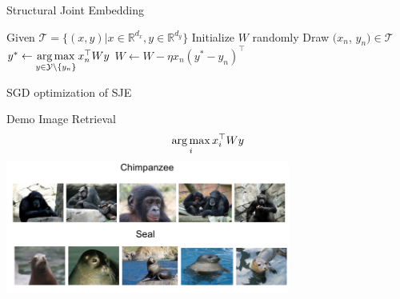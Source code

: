 \documentclass[mathserif, xcolor=table]{beamer}
\def\T{\mathcal{T}}
\def\R{\mathbb{R}}
\def\Y{\mathcal{Y}}
\def\argmax{\mathop{\rm arg\,max}\limits}%
\def\Y{\mathcal{Y}}
\begin{document}
\begin{frame}{Structural Joint Embedding}

\begin{algorithm}[H]
\begin{algorithmic}[1]
\STATE  Given $\T = \{(x, y)| x \in \R^{d_x}, y \in \R^{d_y}\}$ 
\STATE  Initialize $W$ randomly
\FOR{$n=1$ to $|\T|$}
     		\STATE  Draw $(x_n$, $y_n) \in \T$
     		\STATE $y^* \leftarrow \argmax\limits_{y \in \Y \setminus \{y_n\}} x_n^\top W y$
					\STATE	$W \leftarrow W - \eta x_n (y^* - y_n)^\top$ 
        		\ENDIF
\ENDFOR
\ENDFOR
\end{algorithmic}
\caption{SGD optimization of SJE }
\label{alg:seq}
\end{algorithm}


\end{frame}

\begin{frame}{Demo}
Image Retrieval
\begin{equation*}
	\argmax_{i} x_i^\top W y 
\end{equation*}
\center
\includegraphics[width=0.7\textwidth]{sje_cont_AWA}

\end{frame}
\end{document}
